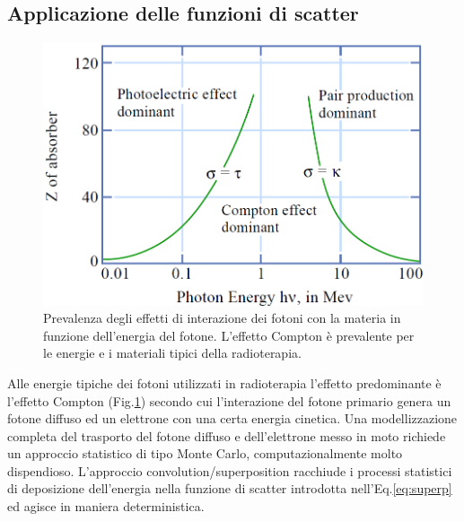 {\subsection{Applicazione delle funzioni di scatter}
\label{sec:scatter_fun}

\begin{figure}
\centering
\includegraphics[width=.7\textwidth]{./cap1/compt_dom.png}
\caption{Prevalenza degli effetti di interazione dei fotoni con la materia in funzione dell'energia del fotone. L'effetto Compton è prevalente per le energie e i materiali tipici della radioterapia.}
\label{fig:compt_dom}
\end{figure}
Alle energie tipiche dei fotoni utilizzati in radioterapia l'effetto predominante è l'effetto Compton (Fig.\ref{fig:compt_dom}) secondo cui l'interazione del fotone primario genera un fotone diffuso ed un elettrone con una certa energia cinetica. Una modellizzazione completa del trasporto del fotone diffuso e dell'elettrone messo in moto richiede un approccio statistico di tipo Monte Carlo, computazionalmente molto dispendioso. L'approccio convolution/superposition racchiude i processi statistici di deposizione dell'energia nella funzione di scatter introdotta nell'Eq.\eqref{eq:superp} ed agisce in maniera deterministica.

}
